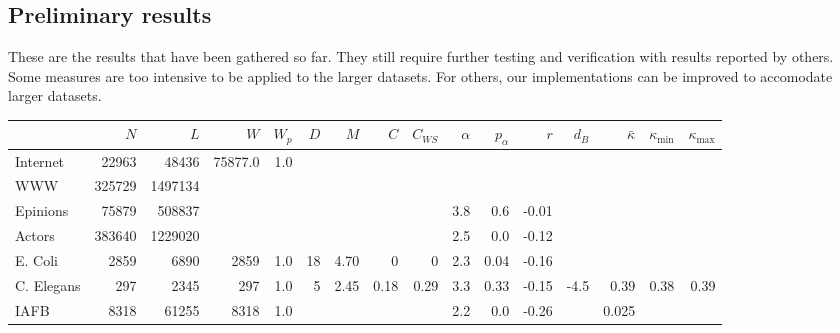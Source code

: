 \documentclass{article}
\theoremstyle{definition}
\begin{document}
\begin{landscape}

\section*{Preliminary results}

These are the results that have been gathered so far. They still require further testing and verification with results reported by others. Some measures are too intensive to be applied to the larger datasets. For others, our implementations can be improved to accomodate larger datasets.

\begin{tabular}{l | r r r r r r r r r r r r r r r }
  \hline
    & $N$ & $L$ & $W$ & $W_p$ & $D$ & $M$ & $C$ & $C_{WS}$ & $\alpha$ & $p_\alpha$ & $r$ & $d_B$ & $\bar{\kappa}$ & $\kappa_{\mbox{min}}$ & $\kappa_{\mbox{max}}$  \\
    \hline
 Internet & 22963 & 48436 & 75877.0 & 1.0 & & & & & & & & & & & \\   
 WWW & 325729 & 1497134 & & & & & & & & & & & & & \\
 Epinions & 75879 & 508837 & & & & & & & 3.8 & 0.6 & -0.01 & & & & \\ 
 Actors  & 383640 & 1229020 & & & & & & & \color{gray}2.5 & 0.0 & -0.12 & & & & \\
 E. Coli  & 2859 & 6890 & 2859 & 1.0 & 18 & 4.70 & 0 & 0 & \color{gray} 2.3 & 0.04 & -0.16 & & & & \\
 C. Elegans  & 297 & 2345 & 297 & 1.0 & 5 & 2.45 & 0.18 & 0.29 & 3.3 & 0.33 & -0.15 & -4.5 & 0.39 & 0.38 & 0.39 \\
 IAFB  & 8318 & 61255 & 8318 & 1.0 & & & & & \color{gray} 2.2 & 0.0 & -0.26 & & 0.025 & &  \\ 
 \hline

\end{tabular}

\end{landscape}



\end{document}
